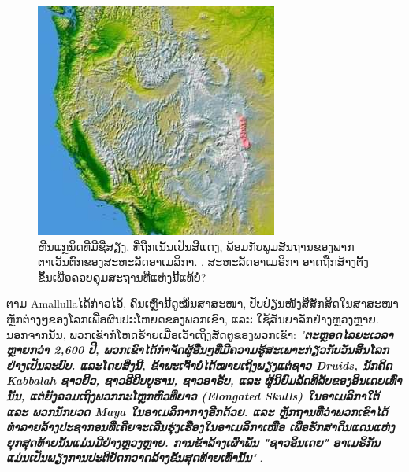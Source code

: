 \documentclass[10pt,twocolumn,letterpaper]{article}
\begin{document}
\begin{figure}[t]
\begin{center}
   \includegraphics[width=1\linewidth]{pike.jpg}
\end{center}
   \caption{ຫີນແກຼນິດທີ່ມີຊື່ສຽງ, ທີ່ຖືກເນັ້ນເປັນສີແດງ, ພ້ອມກັບພູມສັນຖານຂອງພາກຕາເວັນຕົກຂອງສະຫະລັດອາເມລິກາ. \cite{36}. ສະຫະລັດອາເມຣິກາ ອາດຖືກສ້າງຕັ້ງຂຶ້ນເພື່ອຄວບຄຸມສະຖານທີ່ແຫ່ງນີ້ແທ້ບໍ່?}
\label{fig:11}
\label{fig:onecol}
\end{figure}

ຕາມ Amallullaໄດ້ກ່າວໄວ້, ຄົນເຫຼົ່ານີ້ດູໝິ່ນສາສະໜາ, ປັບປ່ຽນໜັງສືສັກສິດໃນສາສະໜາຫຼັກຕ່າງໆຂອງໂລກເພື່ອຜົນປະໂຫຍດຂອງພວກເຂົາ, ແລະ ໃຊ້ສັນຍາລັກຢ່າງຫຼວງຫຼາຍ.
ນອກຈາກນັ້ນ, ພວກເຂົາກໍໂຫດຮ້າຍເມື່ອເວົ້າເຖິງສັດຕູຂອງພວກເຂົາ: \textit{"\textbf{ຕະຫຼອດໄລຍະເວລາຫຼາຍກວ່າ 2,600 ປີ, ພວກເຂົາໄດ້ກຳຈັດຜູ້ອື່ນໆທີ່ມີຄວາມຮູ້ສະເພາະກ່ຽວກັບວັນສິ້ນໂລກຢ່າງເປັນລະບົບ. ແລະໂດຍສິ່ງນີ້, ຂ້າພະເຈົ້າບໍ່ໄດ້ໝາຍເຖິງພຽງແຕ່ຊາວ Druids, ນັກຄິດ Kabbalah ຊາວຢິວ, ຊາວອີຢິບບູຮານ, ຊາວອາຣັບ, ແລະ ຜູ້ນິຍົມລັດທິລັບຂອງອິນເດຍເທົ່ານັ້ນ, ແຕ່ຍັງລວມເຖິງພວກກະໂຫຼກຫົວທີ່ຍາວ (Elongated Skulls) ໃນອາເມລິກາໃຕ້ ແລະ ພວກນັກບວດ Maya ໃນອາເມລິກາກາງອີກດ້ວຍ. ແລະ ຫຼັກຖານທີ່ວ່າພວກເຂົາໄດ້ທຳລາຍລ້າງປະຊາກອນທີ່ເຄີຍຈະເລີນຮຸ່ງເຮືອງໃນອາເມລິກາເໜືອ ເພື່ອຮັກສາດິນແດນແຫ່ງຍຸກສຸດທ້າຍນັ້ນແມ່ນມີຢ່າງຫຼວງຫຼາຍ. ການຂ້າລ້າງເຜົ່າພັນ "ຊາວອິນເດຍ" ອາເມຣິກັນ ແມ່ນເປັນພຽງການປະຕິບັດກວາດລ້າງຂັ້ນສຸດທ້າຍເທົ່ານັ້ນ}"} \cite{33,34}.
\end{document}
